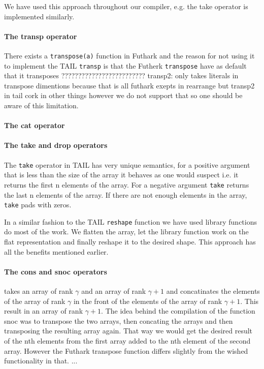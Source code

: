 \documentclass[11pt]{article}
\begin{document}
We have used this approach throughout our compiler, e.g. the take operator is implemented similarly.

\paragraph{The transp operator} 
There exists a {\tt transpose(a)} function in Futhark and the reason for not using it to implement the TAIL {\tt transp} is that the Futherk {\tt transpose} have as default that it transposes ?????????????????????????
transp2: only takes literals in transpose dimentions because that is all futhark exepts in rearrange but transp2 in tail cork in other things however we do not support that so one should be aware of this limitation.

\paragraph{The cat operator} 

\paragraph{The take and drop operators} 
The {\tt take} operator in TAIL has very unique semantics, for a positive argument that is less than the size of the array it behaves as one would suspect i.e. it returns the first n elements of the array.
For a negative argument {\tt take} returns the last n elements of the array.
If there are not enough elements in the array, {\tt take} pads with zeros.

In a similar fashion to the TAIL {\tt reshape} function we have used library functions do most of the work.
We flatten the array, let the library function work on the flat representation and finally reshape it to the desired shape.
This approach has all the benefits mentioned earlier.

\paragraph{The cons and snoc operators} takes an array of rank $\gamma$ and an array of rank $\gamma+1$ and concatinates the elements of the 
array of rank $\gamma$ in the front of the elements of the array of rank $\gamma +1$. This result in an array of rank $\gamma+1$. 
The idea behind the compilation of the function snoc was to transpose the two arrays, then concating the arrays and then transposing the resulting array again. That way we would get the desired result of the nth elements from the first array added to the nth element of the second array. However the Futhark transpose function differs slightly from the wished functionality in that. ...\\
\end{document}
